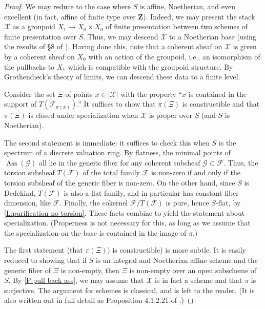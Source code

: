 \documentclass[11pt]{amsart}
\newcommand{\field}[1]{\mathbf #1}
\newcommand{\ms}[1]{\mathscr #1}
\newcommand{\Z}{\field Z}
\renewcommand{\[}{[\!\hspace{0.03em}[}
\renewcommand{\]}{]\!\hspace{0.03em}]}
\renewcommand{\(}{(\!\hspace{0.03em}(}
\renewcommand{\)}{)\!\hspace{0.03em})}
\theoremstyle{definition}
\theoremstyle{remark}
\begin{document}
\begin{proof} We may reduce to the case where $S$ is affine, Noetherian, and 
even excellent (in fact, affine of finite type over 
$\Z$).  Indeed, we may present the stack $\ms X$ as a groupoid 
$X_{1}\to X_{0}\times X_{0}$ of 
finite presentation between two schemes of finite presentation 
over $S$.  Thus, we may descend $\ms X$ to a Noetherian base (using the results of \S 8 of \cite{ega4-3}).  Having 
done this, note that a coherent sheaf on $\ms X$ is given by a 
coherent sheaf on $X_{0}$ with an action of the groupoid, i.e., an 
isomorphism of the pullbacks to $X_{1}$ which is compatible with the 
groupoid structure.  By Grothendieck's theory of limits, we can 
descend these data to a finite level.

Consider the set $\Xi$ of points $x\in|\ms X|$ with the property ``$x$ is 
contained in the support of $T(\ms F_{\pi(x)})$.''  It suffices to show that  
$\pi(\Xi)$ is constructible and that $\pi(\Xi)$ is closed under 
specialization when $\ms X$ is proper over $S$ (and $S$ is Noetherian).

The second statement is immediate: it suffices to check this when $S$ 
is the spectrum of a discrete valuation ring.  By flatness, the 
minimal points of $\operatorname{Ass}(\ms G)$ all lie in the generic 
fiber for any coherent subsheaf $\ms G\subset\ms F$.  Thus, the 
torsion subsheaf $T(\ms F)$ of the total family $\ms F$ is non-zero if 
and only if the torsion subsheaf of the generic fiber is non-zero.  On 
the other hand, since $S$ is Dedekind, $T(\ms F)$ is also a flat 
family, and in particular has constant fiber dimension, like $\ms F$.  
Finally, the cokernel $\ms F/T(\ms F)$ is pure, hence $S$-flat, by 
\ref{L:purification no torsion}.  These facts combine to yield the 
statement about specialization.  (Properness is not necessary for 
this, as long as we assume that the specialization on the base is 
contained in the image of $\pi$.)

The first statement (that $\pi(\Xi)$) is constructible) is more 
subtle.  It is easily reduced to showing that if $S$ is an integral and 
Noetherian affine scheme and the generic fiber of $\Xi$ is non-empty, then $\Xi$ is 
non-empty over an open subscheme of $S$.  By \ref{P:pull back ass}, we 
may assume that $\ms X$ is in fact a scheme and that $\pi$ is 
surjective.  The argument for schemes is classical, and is left to 
the reader.  (It is also written out in full detail as Proposition 
4.1.2.21 of \cite{mythesis}.)
\end{proof}
 
\end{document}
